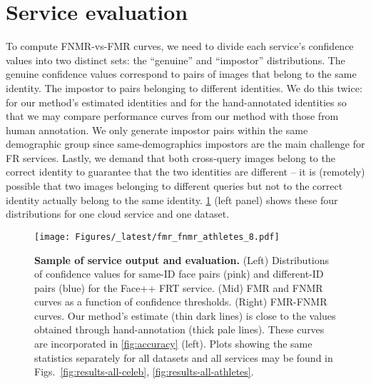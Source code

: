 \documentclass[10pt,twocolumn,letterpaper]{article}
\begin{document}
\section{Service evaluation}
\label{sec:results}

To compute FNMR-vs-FMR curves, we need to divide each service's confidence values into two distinct sets: the ``genuine'' and ``impostor''  distributions. The genuine confidence values correspond to pairs of images that belong to the same identity. The impostor to pairs belonging to different identities. We do this twice: for our method's estimated identities and for the hand-annotated identities so that we may compare performance curves from our method with those from human annotation.  We only generate impostor pairs within the same demographic group since same-demographics impostors are the main challenge for FR services. Lastly, we demand that both cross-query images belong to the correct identity to guarantee that the two identities are different -- it is (remotely) possible that two images belonging to different queries but not to the correct identity actually belong to the same identity.  \cref{fig:fmr-fmnr-single-row-example} (left panel) shows these four distributions for one cloud service and one dataset.

\begin{figure}[t!]
    \centering\texttt{[image: Figures/\_latest/fmr\_fnmr\_athletes\_8.pdf]}
    \caption{{\bf Sample of service output and evaluation.}  (Left) Distributions of confidence values for same-ID face pairs (pink) and different-ID pairs (blue) for the Face++ FRT service. (Mid) FMR and FNMR curves as a function of confidence thresholds. (Right) FMR-FNMR curves. Our method's estimate (thin dark lines) is close to the values obtained through hand-annotation (thick pale lines). These curves are incorporated in \cref{fig:accuracy} (left). Plots showing the same statistics separately for all datasets and all services may be found in Figs.~\ref{fig:results-all-celeb}, \ref{fig:results-all-athletes}.}
    \label{fig:fmr-fmnr-single-row-example}
    \vspace{2mm}
\end{figure}
\end{document}
